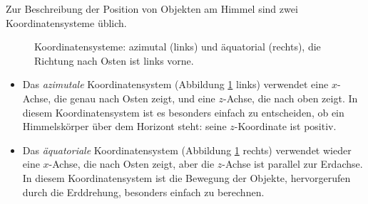 Zur Beschreibung der Position von Objekten am Himmel sind zwei
Koordinatensysteme üblich.
\begin{figure}[ht]
\begin{center}
\quad
\quad
{}
\end{center}
\caption{Koordinatensysteme: azimutal (links) und äquatorial (rechts),
die Richtung nach Osten ist links vorne.
\label{40000029:coord}}
\end{figure}
\begin{itemize}
\item
Das {\it azimutale} Koordinatensystem
(Abbildung \ref{40000029:coord} links)
verwendet eine $x$-Achse, die genau nach Osten zeigt, und eine $z$-Achse,
die nach oben zeigt.
In diesem Koordinatensystem ist es besonders einfach zu entscheiden, ob
ein Himmelskörper über dem Horizont steht: seine $z$-Koordinate ist
positiv.
\item
Das {\it äquatoriale} Koordinatensystem
(Abbildung \ref{40000029:coord} rechts)
verwendet wieder eine $x$-Achse,
die nach Osten zeigt, aber die $z$-Achse ist parallel zur Erdachse.
In diesem Koordinatensystem ist die Bewegung der Objekte, hervorgerufen
durch die Erddrehung, besonders einfach zu berechnen.
\end{itemize}
